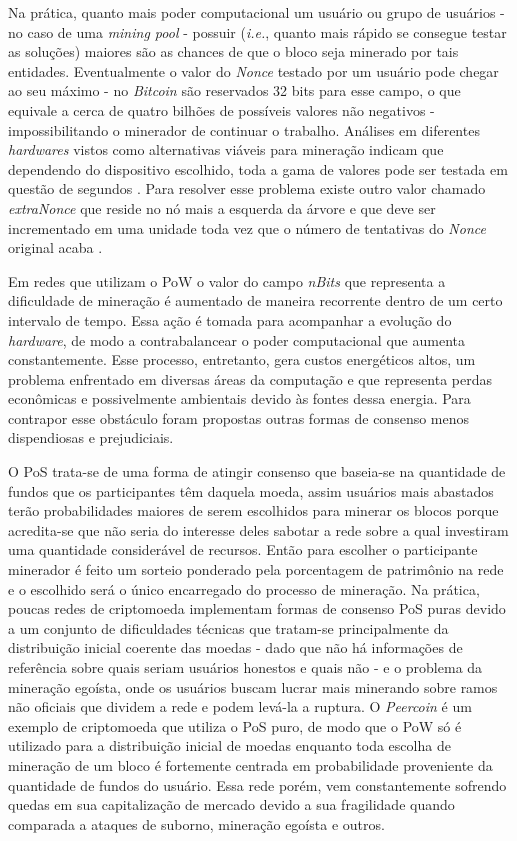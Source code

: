 %
Na prática, quanto mais poder computacional um usuário ou grupo de usuários - no caso de uma \textit{mining pool} - possuir (\textit{i.e.}, quanto mais rápido se consegue testar as soluções) maiores são as chances de que o bloco seja minerado por tais entidades. Eventualmente o valor do \textit{Nonce} testado por um usuário pode chegar ao seu máximo - no \textit{Bitcoin} são reservados 32 bits para esse campo, o que equivale a cerca de quatro bilhões de possíveis valores não negativos - impossibilitando o minerador de continuar o trabalho. Análises em diferentes \textit{hardwares} vistos como alternativas viáveis para mineração indicam que dependendo do dispositivo escolhido, toda a gama de valores pode ser testada em questão de segundos \cite{blockchain:energia}. Para resolver esse problema existe outro valor chamado \textit{extraNonce} que reside no nó mais a esquerda da árvore e que deve ser incrementado em uma unidade toda vez que o número de tentativas do \textit{Nonce} original acaba \cite{blockchain:mastering_bitcoin}. 

Em redes que utilizam o \ac{PoW} o valor do campo \textit{nBits} que representa a dificuldade de mineração é aumentado de maneira recorrente dentro de um certo intervalo de tempo. Essa ação é tomada para acompanhar a evolução do \textit{hardware}, de modo a contrabalancear o poder computacional que aumenta constantemente. Esse processo, entretanto, gera custos energéticos altos, um problema enfrentado em diversas áreas da computação e que representa perdas econômicas e possivelmente ambientais devido às fontes dessa energia. Para contrapor esse obstáculo foram propostas outras formas de consenso menos dispendiosas e prejudiciais.

%
O \ac{PoS} trata-se de uma forma de atingir consenso que baseia-se na quantidade de fundos que os participantes têm daquela moeda, assim usuários mais abastados terão probabilidades maiores de serem escolhidos para minerar os blocos porque acredita-se que não seria do interesse deles sabotar a rede sobre a qual investiram uma quantidade considerável de recursos. Então para escolher o participante minerador é feito um sorteio ponderado pela porcentagem de patrimônio na rede e o escolhido será o único encarregado do processo de mineração. Na prática, poucas redes de criptomoeda implementam formas de consenso \ac{PoS} puras devido a um conjunto de dificuldades técnicas que tratam-se principalmente da distribuição inicial coerente das moedas - dado que não há informações de referência sobre quais seriam usuários honestos e quais não - e o problema da mineração egoísta, onde os usuários buscam lucrar mais minerando sobre ramos não oficiais que dividem a rede e podem levá-la a ruptura. O \textit{Peercoin} é um exemplo de criptomoeda que utiliza o \ac{PoS} puro, de modo que o \ac{PoW} só é utilizado para a distribuição inicial de moedas enquanto toda escolha de mineração de um bloco é fortemente centrada em probabilidade proveniente da quantidade de fundos do usuário. Essa rede porém, vem constantemente sofrendo quedas em sua capitalização de mercado devido a sua fragilidade quando comparada a ataques de suborno, mineração egoísta e outros\cite{blockchain:peercoin_pos}. 


